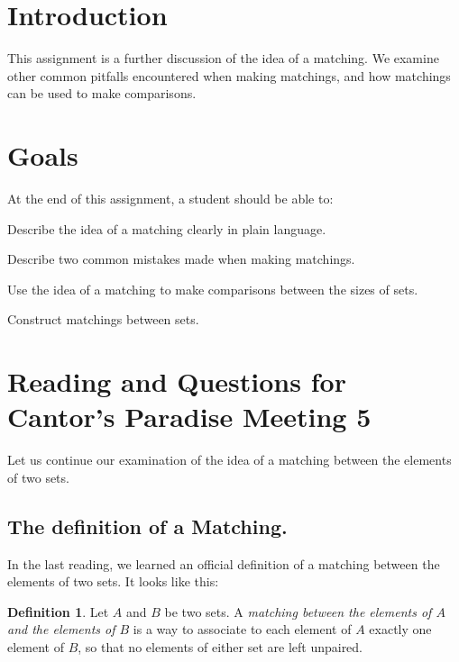 \documentclass[12pt,letterpaper]{article}
\theoremstyle{definition}
\newtheorem*{definition}{Definition}
\begin{document}
\setlength{\parskip}{1ex plus 0.5ex minus 0.2ex}
\setlength{\parindent}{0pt}

\pagestyle{fancy}
\cfoot{}

\section*{Introduction}
This assignment is a further discussion of the idea of a matching.
We examine other common pitfalls encountered when making matchings, and how matchings can be used to make comparisons.

\section*{Goals}
At the end of this assignment, a student should be able to:
\begin{compactitem}
\item Describe the idea of a matching clearly in plain language.
\item Describe two common mistakes made when making matchings.
\item Use the idea of a matching to make comparisons between the sizes of sets.
\item Construct matchings between sets.
\end{compactitem}


\section*{Reading and Questions for Cantor's Paradise Meeting 5}

Let us continue our examination of the idea of a matching between the elements of two sets.

\subsection*{The definition of a Matching.}
In the last reading, we learned an official definition of a matching between the elements of two sets.
It looks like this:
\begin{definition}
Let $A$ and $B$ be two sets.
A \emph{matching between the elements of $A$ and the elements of $B$} is a way to associate to each element of $A$ exactly one element of $B$, so that no elements of either set are left unpaired.
\end{definition}
\end{document}
